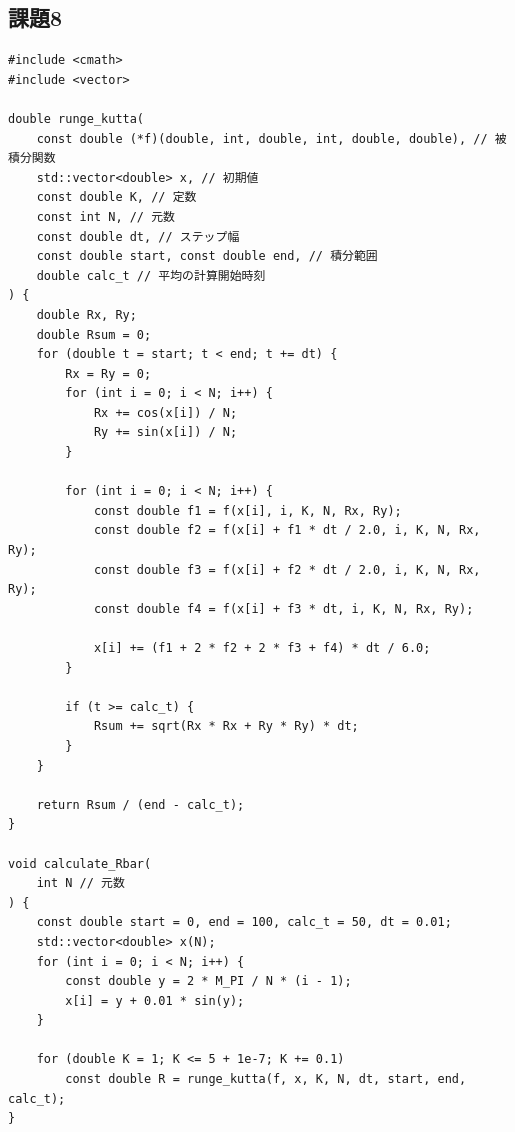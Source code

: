 \documentclass[a4j, titlepage]{jsarticle}
\numberwithin{equation}{section}
\begin{document}
    \subsection{課題8}
        \begin{lstlisting}[caption=4次ルンゲ・クッタ法による$\bar{R}(K)$の計算]
#include <cmath>
#include <vector>

double runge_kutta(
    const double (*f)(double, int, double, int, double, double), // 被積分関数
    std::vector<double> x, // 初期値
    const double K, // 定数
    const int N, // 元数
    const double dt, // ステップ幅
    const double start, const double end, // 積分範囲
    double calc_t // 平均の計算開始時刻
) {
    double Rx, Ry;
    double Rsum = 0;
    for (double t = start; t < end; t += dt) {
        Rx = Ry = 0;
        for (int i = 0; i < N; i++) {
            Rx += cos(x[i]) / N;
            Ry += sin(x[i]) / N;
        }

        for (int i = 0; i < N; i++) {
            const double f1 = f(x[i], i, K, N, Rx, Ry);
            const double f2 = f(x[i] + f1 * dt / 2.0, i, K, N, Rx, Ry);
            const double f3 = f(x[i] + f2 * dt / 2.0, i, K, N, Rx, Ry);
            const double f4 = f(x[i] + f3 * dt, i, K, N, Rx, Ry);

            x[i] += (f1 + 2 * f2 + 2 * f3 + f4) * dt / 6.0;
        }

        if (t >= calc_t) {
            Rsum += sqrt(Rx * Rx + Ry * Ry) * dt;
        }
    }

    return Rsum / (end - calc_t);
}

void calculate_Rbar(
    int N // 元数
) {
    const double start = 0, end = 100, calc_t = 50, dt = 0.01;
    std::vector<double> x(N);
    for (int i = 0; i < N; i++) {
        const double y = 2 * M_PI / N * (i - 1);
        x[i] = y + 0.01 * sin(y);
    }

    for (double K = 1; K <= 5 + 1e-7; K += 0.1)
        const double R = runge_kutta(f, x, K, N, dt, start, end, calc_t);
}
        \end{lstlisting}

\newpage
{}
\begin{thebibliography}{99}
\end{thebibliography}
\end{document}
